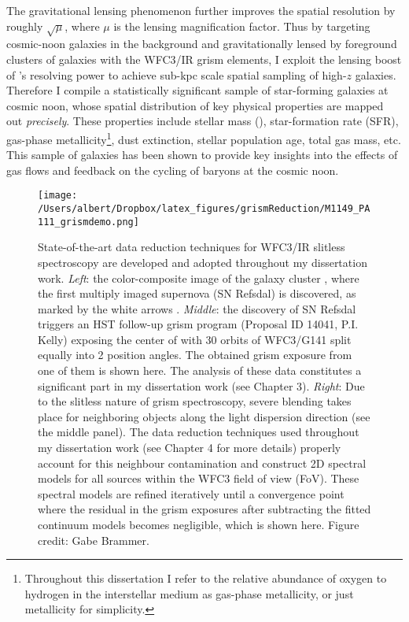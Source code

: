 The gravitational lensing phenomenon further improves the spatial resolution by roughly $\sqrt{\mu}$,
where $\mu$ is the lensing magnification factor.
Thus by targeting cosmic-noon galaxies in the background and
gravitationally lensed by foreground clusters of galaxies with the \hst WFC3/IR grism elements, I exploit the
lensing boost of \hst's resolving power to achieve sub-kpc scale spatial sampling of high-$z$ galaxies.
Therefore I compile a statistically significant sample of star-forming galaxies at cosmic noon,
whose spatial distribution of key physical properties are mapped out \emph{precisely}.
These properties include stellar mass (\Mstar), star-formation rate (SFR), gas-phase
metallicity\footnote{Throughout this dissertation I refer to the relative abundance of oxygen to hydrogen in the
interstellar medium as gas-phase metallicity, or just metallicity for simplicity.}, dust extinction, stellar
population age, total gas mass, etc.
This sample of galaxies has been shown to provide key insights into the effects of gas flows and feedback on the
cycling of baryons at the cosmic noon.

\begin{figure}
    \centering
    \texttt{[image: /Users/albert/Dropbox/latex\_figures/grismReduction/M1149\_PA111\_grismdemo.png]}
    \caption[State-of-the-art data reduction techniques for \hst WFC3/IR slitless spectroscopy.]{
    State-of-the-art data reduction techniques for \hst WFC3/IR slitless spectroscopy are developed and adopted 
    throughout my dissertation work.
    \textit{Left}: the color-composite image of the galaxy cluster \clyi, where the first multiply imaged
    supernova (\ie SN Refsdal) is discovered, as marked by the white arrows \citep{2015Sci...347.1123K}.
    \textit{Middle}: the discovery of SN Refsdal triggers an HST follow-up grism program (Proposal ID 14041, P.I.
    Kelly) exposing the center of \clyi with 30 orbits of WFC3/G141 split equally into 2 position angles.
    The obtained grism exposure from one of them is shown here.
    The analysis of these data constitutes a significant part in my dissertation work (see Chapter 3).
    \textit{Right}: Due to the slitless nature of \hst grism spectroscopy, severe blending takes place for
    neighboring objects along the light dispersion direction (see the middle panel).
    The data reduction techniques used throughout my dissertation work (see Chapter 4 for more details) 
    properly account for this neighbour contamination and construct 2D spectral models for all sources 
    within the WFC3 field of view (FoV).
    These spectral models are refined iteratively until a convergence point where the residual in the grism
    exposures after subtracting the fitted continuum models becomes negligible, which is shown here.
    Figure credit: Gabe Brammer.
    \label{fig:macs1149_grism}}
\end{figure}


